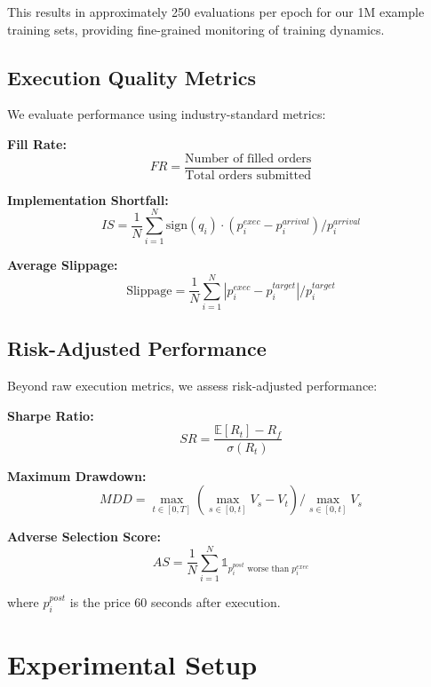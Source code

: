 \documentclass{report}
\begin{document}
This results in approximately 250 evaluations per epoch for our 1M example training sets, providing fine-grained monitoring of training dynamics.

\subsection{Execution Quality Metrics}

We evaluate performance using industry-standard metrics:

\textbf{Fill Rate:}
\begin{equation}
FR = \frac{\text{Number of filled orders}}{\text{Total orders submitted}}
\end{equation}

\textbf{Implementation Shortfall:}
\begin{equation}
IS = \frac{1}{N} \sum_{i=1}^{N} \text{sign}(q_i) \cdot (p^{exec}_i - p^{arrival}_i) / p^{arrival}_i
\end{equation}

\textbf{Average Slippage:}
\begin{equation}
\text{Slippage} = \frac{1}{N} \sum_{i=1}^{N} |p^{exec}_i - p^{target}_i| / p^{target}_i
\end{equation}

\subsection{Risk-Adjusted Performance}

Beyond raw execution metrics, we assess risk-adjusted performance:

\textbf{Sharpe Ratio:}
\begin{equation}
SR = \frac{\mathbb{E}[R_t] - R_f}{\sigma(R_t)}
\end{equation}

\textbf{Maximum Drawdown:}
\begin{equation}
MDD = \max_{t \in [0,T]} \left( \max_{s \in [0,t]} V_s - V_t \right) / \max_{s \in [0,t]} V_s
\end{equation}

\textbf{Adverse Selection Score:}
\begin{equation}
AS = \frac{1}{N} \sum_{i=1}^{N} \mathbb{1}_{p^{post}_i \text{ worse than } p^{exec}_i}
\end{equation}

where $p^{post}_i$ is the price 60 seconds after execution.

\section{Experimental Setup}
\end{document}
